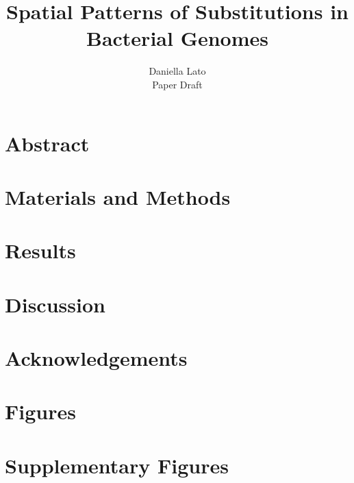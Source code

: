 \documentclass[11pt]{article}
\title{\sc Spatial Patterns of Substitutions in Bacterial Genomes}
\author{\sc Daniella Lato \\ \sc Paper Draft}
\newcommand{\beginsupplement}{%
	\setcounter{table}{0}
	\renewcommand{\thetable}{S\arabic{table}}%
	\setcounter{figure}{0}
	\renewcommand{\thefigure}{S\arabic{figure}}%
}
\begin{document}
	\thispagestyle{empty}
	\maketitle
	\thispagestyle{empty}	
	\newpage
	\doublespacing
	
	\section{Abstract}

	\section{Materials and Methods}
	
	\section{Results}
	
	\section{Discussion}

\section{Acknowledgements}	

	\newpage
	
	
	
	
	\newpage
	
	\section{Figures}
\newpage
	\section{Supplementary Figures}
	\beginsupplement
	
\end{document}
